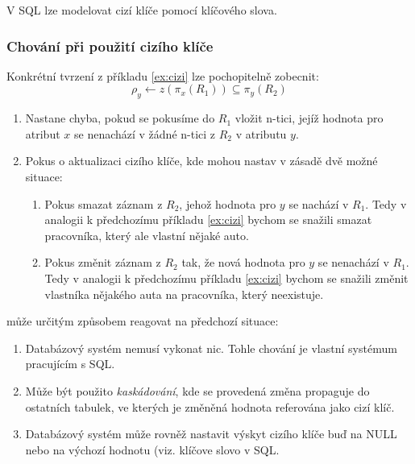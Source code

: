 V SQL lze modelovat cizí klíče pomocí klíčového slova.

\subsubsection{Chování při použití cizího klíče}
Konkrétní tvrzení z příkladu \ref{ex:cizi} lze pochopitelně zobecnit:
$$
\rho_{y} \leftarrow z(\pi_{x} \left( R_{1} \right) ) \subseteq \pi_{y} \left( R_{2} \right)
$$
\begin{enumerate}
\item Nastane chyba, pokud se pokusíme do $R_{1}$ vložit n-tici, jejíž hodnota pro atribut $x$  se nenachází v žádné n-tici z $R_{2}$ v atributu $y$.
\item Pokus o aktualizaci cizího klíče, kde mohou nastav v zásadě dvě možné situace:
\begin{enumerate}
\item Pokus smazat záznam z $R_{2}$, jehož hodnota pro $y$ se nachází v $R_{1}$. Tedy v analogii k předchozímu příkladu \ref{ex:cizi} bychom se snažili smazat pracovníka, který ale vlastní nějaké auto.
\item Pokus změnit záznam z $R_{2}$ tak, že nová hodnota pro $y$ se nenachází v $R_{1}$. Tedy v analogii k předchozímu příkladu \ref{ex:cizi} bychom se snažili změnit vlastníka nějakého auta na pracovníka, který neexistuje.
\end{enumerate}
\end{enumerate}

 může určitým způsobem reagovat na předchozí situace:
\begin{enumerate}
\item Databázový systém nemusí vykonat nic. Tohle chování je vlastní systémum pracujícím s SQL.
\item Může být použito \textit{kaskádování}, kde se provedená změna propaguje do ostatních tabulek, ve kterých je změněná hodnota referována jako cizí klíč.
\item Databázový systém může rovněž nastavit výskyt cizího klíče buď na NULL nebo na výchozí hodnotu (viz. klíčove slovo v SQL.
\end{enumerate}


